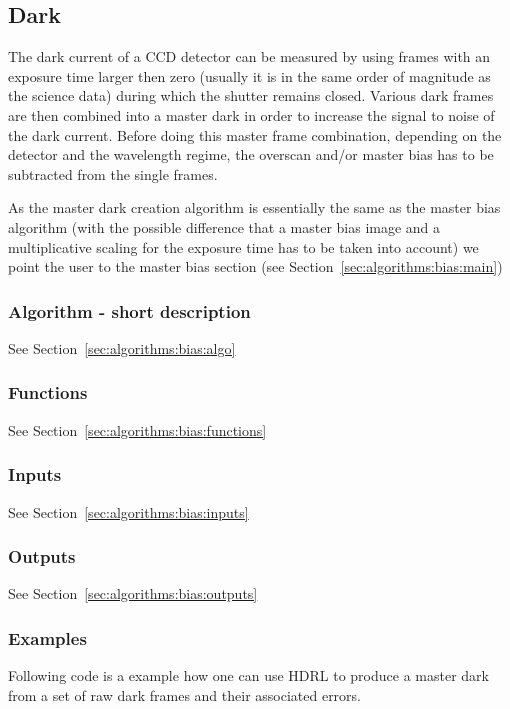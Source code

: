 \subsection{Dark}

The dark current of a CCD detector can be measured by using frames
with an exposure time larger then zero (usually it is in the same
order of magnitude as the science data) during which the shutter
remains closed.
Various dark frames are then combined into a master
dark in order to increase the signal to noise of the dark current.
Before doing this master frame combination, depending on the
detector and the wavelength regime, the overscan and/or master bias
has to be subtracted from the single frames.

As the master dark creation algorithm is essentially the same as the
master bias algorithm (with the possible difference that a master bias
image and a multiplicative scaling for the exposure time has to be
taken into account) we point the user to the master bias section (see
Section~\ref{sec:algorithms:bias:main})

\subsubsection{Algorithm - short description}
See Section~\ref{sec:algorithms:bias:algo}


\subsubsection{Functions}
See Section~\ref{sec:algorithms:bias:functions}

\subsubsection{Inputs}
See Section~\ref{sec:algorithms:bias:inputs}

\subsubsection{Outputs}
See Section~\ref{sec:algorithms:bias:outputs}


\subsubsection{Examples}
Following code is a example how one can use HDRL to produce a master dark from
a set of raw dark frames and their associated errors.

